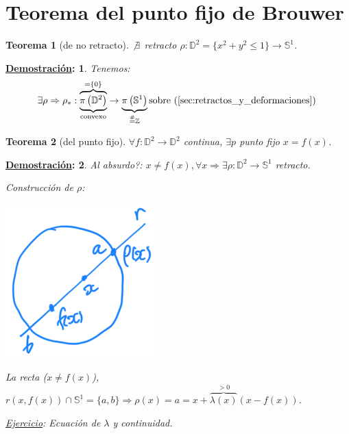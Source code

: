 \documentclass[10pt,a4paper,openright]{book}
\theoremstyle{break}
\newtheorem*{theo}{Teorema}
\newtheorem*{demo}{\underline{Demostración}:}
\begin{document}
\section{Teorema del punto fijo de Brouwer}%
\label{sec:teorema_del_punto_fijo_de_brouwer}

\begin{theo}[de no retracto]
$\not \exists $ retracto $\rho: \mathbb{D}^2 = \{x^2 + y^2 \le 1\} \rightarrow \mathbb{S}^{1}$. 
\end{theo}
\begin{demo}
    Tenemos:
    \[
    \exists \rho \Rightarrow \rho_*: \overbrace{\underbrace{\pi\left( \mathbb{D}^2 \right) }_{\text{convexo}}}^{= \{0\}} \rightarrow \underbrace{\pi\left( \mathbb{S}^{1} \right)}_{\stackrel{\#}{=} \mathbb{Z}} \text{sobre (\ref{sec:retractos_y_deformaciones})
}   \]
\end{demo}

\begin{theo}[del punto fijo]
$\forall f: \mathbb{D}^2 \rightarrow \mathbb{D}^2$ continua, $\exists p$ punto fijo $x = f\left( x\right)$.
\end{theo}
\begin{demo}
Al absurdo?: $x \neq f\left( x \right), \forall x \Rightarrow \exists \rho: \mathbb{D}^2 \rightarrow \mathbb{S}^{1}$ retracto.

Construcción de $\rho$:
\begin{center}
    \includegraphics[scale=0.3]{images/construccion_rho_punto_fijo} 
\end{center}
La recta ($x \neq f\left( x \right)$), $r\left( x, f\left( x \right) \right) \cap \mathbb{S}^{1} = \{a, b\} \Rightarrow \rho\left( x \right) = a = x + \overbrace{\lambda \left( x \right)}^{> 0} \left( x - f\left( x \right) \right)$. 

\underline{Ejercicio}: Ecuación de $\lambda$ y continuidad.
\end{demo}
\end{document}
